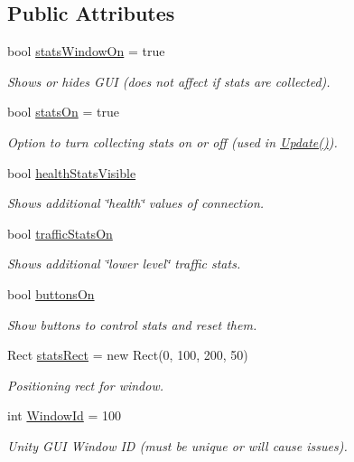 \subsection*{Public Attributes}
\begin{DoxyCompactItemize}
\item 
bool \hyperlink{class_photon_stats_gui_aac6e6189d7a7723ef4fbcbb5c7a6b6e8}{stats\+Window\+On} = true
\begin{DoxyCompactList}\small\item\em Shows or hides G\+UI (does not affect if stats are collected).\end{DoxyCompactList}\item 
bool \hyperlink{class_photon_stats_gui_a7e1cb11640167171f7b160089b71e5d7}{stats\+On} = true
\begin{DoxyCompactList}\small\item\em Option to turn collecting stats on or off (used in \hyperlink{class_photon_stats_gui_a222bbb9f4b1c640489101a5f3bcada8a}{Update()}).\end{DoxyCompactList}\item 
bool \hyperlink{class_photon_stats_gui_a05204c8969fd4fc0546f7926e5e5da8e}{health\+Stats\+Visible}
\begin{DoxyCompactList}\small\item\em Shows additional \char`\"{}health\char`\"{} values of connection.\end{DoxyCompactList}\item 
bool \hyperlink{class_photon_stats_gui_ac8015189e49ffdb616367c7d9f9e91db}{traffic\+Stats\+On}
\begin{DoxyCompactList}\small\item\em Shows additional \char`\"{}lower level\char`\"{} traffic stats.\end{DoxyCompactList}\item 
bool \hyperlink{class_photon_stats_gui_ac7c5c8556de5ac92dd227339b2e3c36b}{buttons\+On}
\begin{DoxyCompactList}\small\item\em Show buttons to control stats and reset them.\end{DoxyCompactList}\item 
Rect \hyperlink{class_photon_stats_gui_af9e7598de2be45c63c6368727bb60ae5}{stats\+Rect} = new Rect(0, 100, 200, 50)
\begin{DoxyCompactList}\small\item\em Positioning rect for window.\end{DoxyCompactList}\item 
int \hyperlink{class_photon_stats_gui_a9e96e77b74435c5ff2eeccf2d409685f}{Window\+Id} = 100
\begin{DoxyCompactList}\small\item\em Unity G\+UI Window ID (must be unique or will cause issues).\end{DoxyCompactList}\end{DoxyCompactItemize}


